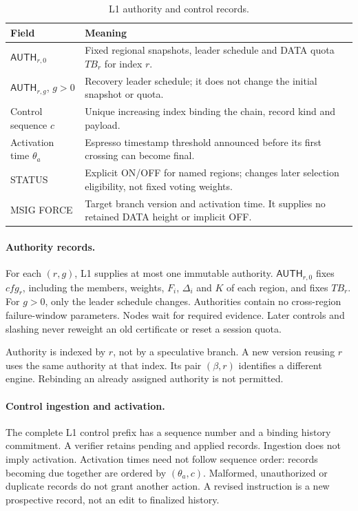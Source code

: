 \documentclass[11pt,a4paper]{article}
\newcommand{\TB}{\mathit{TB}}
\newcommand{\tagg}[1]{\ensuremath{\mathsf{#1}}}
\begin{document}
\begin{table}[htbp]\centering\small
\caption{L1 authority and control records.}\label{tab:l1}
\begin{tabularx}{\linewidth}{@{}p{.27\linewidth}Y@{}}\toprule
Field & Meaning\\\midrule
$\tagg{AUTH}_{r,0}$ & Fixed regional snapshots, leader schedule and
DATA quota $\TB_r$ for index $r$.\\
$\tagg{AUTH}_{r,g}$, $g>0$ & Recovery leader schedule; it does not
change the initial snapshot or quota.\\
Control sequence $c$ & Unique increasing index binding the chain,
record kind and payload.\\
Activation time $\theta_a$ & Espresso timestamp threshold announced
before its first crossing can become final.\\
STATUS & Explicit ON/OFF for named regions; changes later selection
eligibility, not fixed voting weights.\\
MSIG FORCE & Target branch version and activation time.
It supplies no retained DATA height or implicit OFF.\\\bottomrule
\end{tabularx}
\end{table}

\paragraph{Authority records.}
For each $(r,g)$, L1 supplies at most one immutable authority.
$\tagg{AUTH}_{r,0}$ fixes $\mathit{cfg}_r$, including the members,
weights, $F_i$, $\Delta_i$ and $K$ of each region, and fixes $\TB_r$.
For $g>0$, only the leader schedule changes. Authorities contain no
cross-region failure-window parameters.
Nodes wait for required evidence. Later controls and slashing never
reweight an old certificate or reset a session quota.

Authority is indexed by $r$, not by a speculative branch.
A new version reusing $r$ uses the same authority at that index.
Its pair $(\beta,r)$ identifies a different engine. Rebinding an
already assigned authority is not permitted.

\paragraph{Control ingestion and activation.}
The complete L1 control prefix has a sequence number and a binding
history commitment. A verifier retains pending and applied records.
Ingestion does not imply activation. Activation times need not follow
sequence order: records becoming due together are ordered by
$(\theta_a,c)$. Malformed, unauthorized or duplicate records do not
grant another action. A revised instruction is a new prospective
record, not an edit to finalized history.
\end{document}
